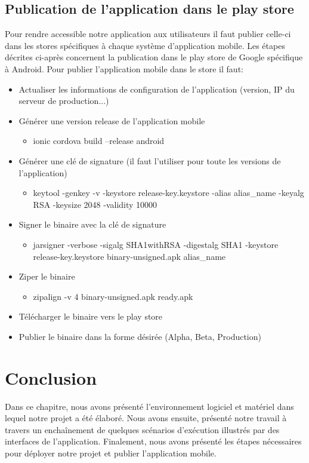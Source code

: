 \subsection{Publication de l'application dans le play store}

\qquad Pour rendre accessible notre application aux utilisateurs il faut publier celle-ci dans les stores spécifiques à chaque système d'application mobile. Les étapes décrites ci-après concernent la publication dans le play store de Google spécifique à Android. Pour publier l'application mobile dans le store il faut:
\begin{itemize}
	\item Actualiser les informations de configuration de l'application (version, IP du serveur de production...)
	\item Générer une version release de l'application mobile
	\begin{itemize}
		\item ionic cordova build --release android
	\end{itemize}
	\item Générer une clé de signature (il faut l'utiliser pour toute les versions de l'application)
	\begin{itemize}
		\item keytool -genkey -v -keystore release-key.keystore -alias alias\_name -keyalg RSA -keysize 2048 -validity 10000
	\end{itemize}
	\item Signer le binaire avec la clé de signature
	\begin{itemize}
		\item jarsigner -verbose -sigalg SHA1withRSA -digestalg SHA1 -keystore release-key.keystore binary-unsigned.apk alias\_name
	\end{itemize}
	\item Ziper le binaire
	\begin{itemize}
		\item zipalign -v 4 binary-unsigned.apk ready.apk
	\end{itemize}
	\item Télécharger le binaire vers le play store
	\item Publier le binaire dans la forme désirée (Alpha, Beta, Production)
\end{itemize}

\section*{Conclusion}
\qquad Dans ce chapitre, nous avons présenté l’environnement logiciel et matériel dans lequel notre projet a été élaboré. Nous avons ensuite, présenté notre travail à travers un enchaînement de quelques scénarios d’exécution illustrés par des interfaces de l’application. Finalement, nous avons présenté les étapes nécessaires pour déployer notre projet et publier l'application mobile.
